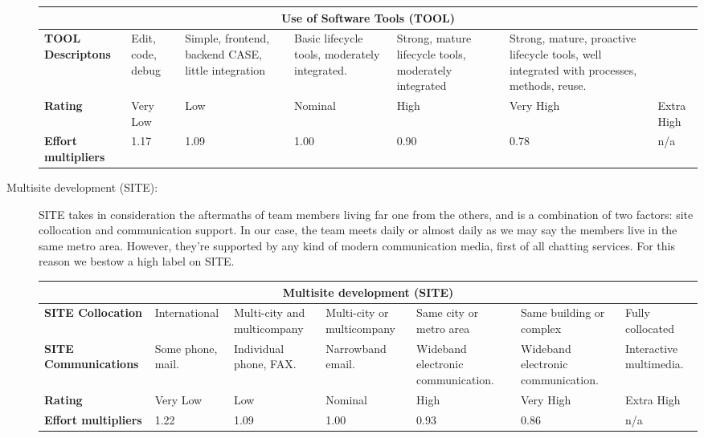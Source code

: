\begin{description}
\begin{tabular}{|p{}|p{}|p{}|p{}|p{}|p{}|p{}|}
\hline
         \multicolumn{7}{|c|}{\textbf{Use of Software Tools (TOOL)}} \\ \hline  \hline
         	\textbf{TOOL Descriptons} &Edit, code, debug &Simple, frontend, backend CASE, little integration & Basic lifecycle tools, moderately integrated.& Strong, mature lifecycle tools, moderately integrated & Strong, mature, proactive lifecycle tools, well integrated with processes, methods, reuse.&\\ \hline
	\textbf{Rating}&Very Low & Low & Nominal  & High & Very High &Extra High\\ \hline
	\textbf{Effort multipliers} & 1.17 & 1.09 & 1.00 & 0.90 & 0.78 & n/a \\ \hline
\end{tabular}

\item[Multisite development (SITE):]  SITE takes in consideration the aftermaths of team members living far one from the others, and is a combination of two factors: site collocation and communication support. In our case, the team meets daily or almost daily as we may say the members live in the same metro area. However, they're supported by any kind of modern communication media, first of all chatting services. For this reason we bestow a high label on SITE.


\begin{tabular}{|p{}|p{}|p{}|p{}|p{}|p{}|p{}|}
\hline
         \multicolumn{7}{|c|}{\textbf{Multisite development (SITE)}} \\ \hline  \hline
         	\textbf{SITE Collocation} &International&Multi-city and multicompany& Multi-city or multicompany& Same city or metro area&Same building or complex&Fully collocated\\ \hline
         	\textbf{SITE Communications} &Some phone, mail.&Individual phone, FAX.& Narrowband email.& Wideband electronic communication.&Wideband electronic communication.& Interactive multimedia.\\ \hline
	\textbf{Rating}&Very Low & Low & Nominal  & High & Very High &Extra High\\ \hline
	\textbf{Effort multipliers} & 1.22 & 1.09 & 1.00 & 0.93 & 0.86 & n/a \\ \hline
\end{tabular}	


\end{description}
